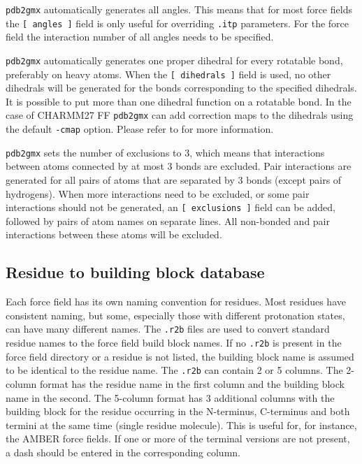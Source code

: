 {\tt pdb2gmx} automatically generates all angles. This means that for 
most force fields the {\tt [~angles~]} field is only useful for overriding 
{\tt .itp} parameters. For the  force field the interaction 
number of all angles needs to be specified.

{\tt pdb2gmx} automatically generates one proper dihedral for every rotatable
bond, preferably on heavy atoms. When the {\tt [~dihedrals~]} field is used,
no other dihedrals will be generated for the bonds corresponding to the
specified  dihedrals. It is possible to put more than one dihedral
function on a rotatable bond. In the case of CHARMM27 FF {\tt pdb2gmx}
can add correction maps to the dihedrals using the default {\tt -cmap} option.
Please refer to  for more information.

{\tt pdb2gmx} sets the number of exclusions to 3, which
means that interactions between atoms connected by at most 3 bonds are
excluded. Pair interactions are generated for all pairs of atoms that are
separated by 3 bonds (except pairs of hydrogens).
When more interactions need to be excluded, or some pair interactions should
not be generated, an {\tt [~exclusions~]} field can be added, followed by
pairs of atom names on separate lines. All non-bonded and pair interactions
between these atoms will be excluded.

\subsection{Residue to building block database}
Each force field has its own naming convention for residues.
Most residues have consistent naming, but some, especially those
with different protonation states, can have many different names.
The {\tt .r2b} files are used to convert standard residue names to
the force field build block names. If no {\tt .r2b} is present
in the force field directory or a residue is not listed, the building
block name is assumed to be identical to the residue name.
The {\tt .r2b} can contain 2 or 5 columns. The 2-column format
has the residue name in the first column and the building block name
in the second. The 5-column format has 3 additional columns with
the building block for the residue occurring in the N-terminus, C-terminus
and both termini at the same time (single residue molecule).
This is useful for, for instance, the AMBER force fields.
If one or more of the terminal versions are not present, a dash should be entered
in the corresponding column.

